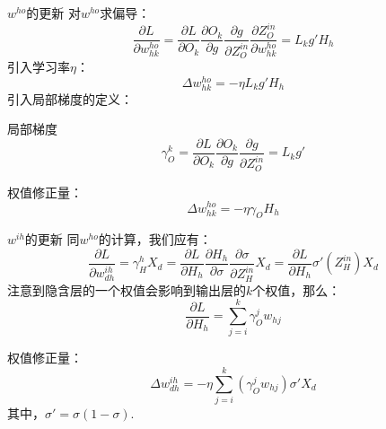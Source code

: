 \documentclass[hyperref,UTF8,11pt]{beamer}
\begin{document}
\begin{frame}{$w^{ho}$的更新}
	对$w^{ho}$求偏导：
	\begin{equation}
		\frac{{\partial L}}{{\partial w_{hk}^{ho}}} = \frac{{\partial L}}{{\partial {O_k}}}\frac{{\partial {O_k}}}{{\partial g}}\frac{{\partial g}}{{\partial Z_O^{in}}}\frac{{\partial Z_O^{in}}}{{\partial w_{hk}^{ho}}} = {L_k}g'{H_h}
	\end{equation}
	引入学习率$\eta$：
	\begin{equation}
		\Delta w_{hk}^{ho} =  - \eta {L_k}g'{H_h}
	\end{equation}
	引入局部梯度的定义：
	\begin{theorem}{局部梯度}
		\begin{equation}
			\gamma _O^k = \frac{{\partial L}}{{\partial {O_k}}}\frac{{\partial {O_k}}}{{\partial g}}\frac{{\partial g}}{{\partial Z_O^{in}}} = {L_k}g'
		\end{equation}
	\end{theorem}
	权值修正量：
	\begin{equation}
		\Delta w_{hk}^{ho} =  - \eta {\gamma _O}{H_h}
	\end{equation}
		
		
\end{frame}


\begin{frame}{$w^{ih}$的更新}
同$w^{ho}$的计算，我们应有：
\begin{equation}
	\frac{{\partial L}}{{\partial w_{dh}^{ih}}} = \gamma _H^h{X_d} = \frac{{\partial L}}{{\partial {H_h}}}\frac{{\partial {H_h}}}{{\partial \sigma }}\frac{{\partial \sigma }}{{\partial Z_H^{in}}}{X_d} = \frac{{\partial L}}{{\partial {H_h}}}\sigma '\left( {Z_H^{in}} \right){X_d}
\end{equation}
注意到隐含层的一个权值会影响到输出层的$k$个权值，那么：
\begin{equation}
	\frac{{\partial L}}{{\partial {H_h}}} = \sum\limits_{j = i}^k {\gamma _O^j{w_{hj}}} 
\end{equation}

权值修正量：
\begin{equation}
	\Delta w_{dh}^{ih} =  - \eta \sum\limits_{j = i}^k {\left( {\gamma _O^j{w_{hj}}} \right)} \sigma '{X_d}
\end{equation}
其中，$\sigma ' = \sigma \left( {1 - \sigma } \right)$.
\end{frame}

\end{document}
